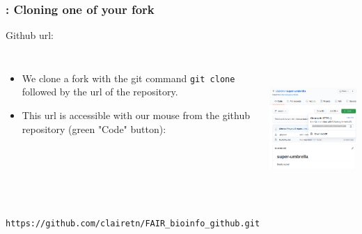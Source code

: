 \begin{frame}[containsverbatim]
\frametitle{: Cloning one of your fork}
\begin{exampleblock}{Github url:}
\begin{columns}
\begin{itemize}
    \item We clone a fork with the git command \verb|git clone| followed by the url of the repository.
    \item This url is accessible with our mouse from the github repository (green "Code" button):
\end{itemize}
\begin{center}
    \includegraphics[height=5cm]{05_history/Images/FAIR_github_clone.png}
\end{center}
\end{columns}
\begin{center}
    \small{\verb|https://github.com/clairetn/FAIR_bioinfo_github.git|}
\end{center}
\end{exampleblock}
\end{frame}
